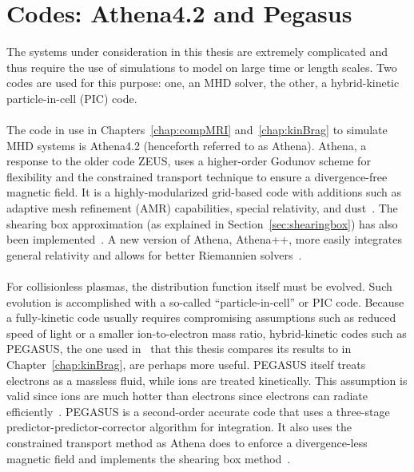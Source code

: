 \section{Codes: Athena4.2 and Pegasus} \label{sec:codes}
The systems under consideration in this thesis are extremely complicated and thus require the use of simulations to model on large time or length scales. Two codes are used for this purpose: one, an MHD solver, the other, a hybrid-kinetic particle-in-cell (PIC) code.\\
\\
The code in use in Chapters~\ref{chap:compMRI} and~\ref{chap:kinBrag} to simulate MHD systems is Athena4.2 (henceforth referred to as Athena). Athena, a response to the older code ZEUS, uses a higher-order Godunov scheme for flexibility and the constrained transport technique to ensure a divergence-free magnetic field. It is a highly-modularized grid-based code with additions such as adaptive mesh refinement (AMR) capabilities, special relativity, and dust~\cite{Stone2008,Stone2009}. The shearing box approximation (as explained in Section~\ref{sec:shearingbox}) has also been implemented~\cite{Stone2010}. A new version of Athena, Athena++, more easily integrates general relativity and allows for better Riemannien solvers~\cite{White2016Thesis,White2016}.\\
\\
For collisionless plasmas, the distribution function itself must be evolved. Such evolution is accomplished with a so-called ``particle-in-cell'' or PIC code. Because a fully-kinetic code usually requires compromising assumptions such as reduced speed of light or a smaller ion-to-electron mass ratio, hybrid-kinetic codes such as PEGASUS, the one used in~\cite{Kunz2016} that this thesis compares its results to in Chapter~\ref{chap:kinBrag}, are perhaps more useful. PEGASUS itself treats electrons as a massless fluid, while ions are treated kinetically. This assumption is valid since ions are much hotter than electrons since electrons can radiate efficiently~\cite{Das2013}. PEGASUS is a second-order accurate code that uses a three-stage predictor-predictor-corrector algorithm for integration. It also uses the constrained transport method as Athena does to enforce a divergence-less magnetic field and implements the shearing box method~\cite{Kunz2013}. 

